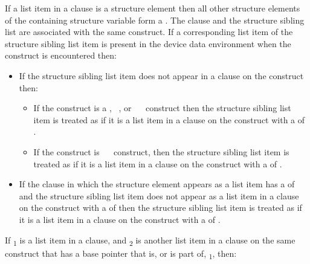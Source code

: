 If a list item in a  clause is a structure element then all other
structure elements of the containing structure variable form a .  The  clause and the structure sibling list are
associated with the same construct.  If a corresponding list item of the
structure sibling list item is present in the device data environment when the
construct is encountered then:

\begin{itemize}
\item If the structure sibling list item does not appear in a 
      clause on the construct then:

\begin{itemize}
\item If the construct is a , ~,
      or ~~ construct then the structure
      sibling list item is treated as if it is a list item in a 
      clause on the construct with a  of .
\item If the construct is ~~
      construct, then the structure sibling list item is treated as if it is
      a list item in a  clause on the construct with a
       of .

\end{itemize}

\item If the  clause in which the structure element appears as a
      list item has a  of  and the structure sibling
      list item does not appear as a list item in a  clause on the
      construct with a  of  then the structure sibling
      list item is treated as if it is a list item in a  clause on the
      construct with a  of .
\end{itemize}

If \textsubscript{1} is a list item in a  clause, and
\textsubscript{2} is another list item in a  clause on the
same construct that has a base pointer that is, or is part of,
\textsubscript{1}, then:

